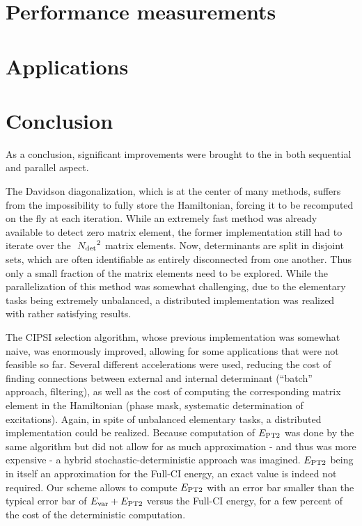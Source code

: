 \documentclass[12pt,a4paper]{report}
\begin{document}
\chapter{Performance measurements}
\minitoc


\chapter{Applications}
\minitoc


\chapter{Conclusion}

As a conclusion, significant improvements were brought to the \QP in both sequential and parallel aspect.

The Davidson diagonalization, which is at the center of many methods, suffers from the impossibility to fully store the Hamiltonian, forcing it to be recomputed on the fly at each iteration. While an extremely fast method was already available to detect zero matrix element,\cite{Scemama_2013} the former implementation still had to iterate over the $~{N_\text{det}}^2$ matrix elements. Now, determinants are split in disjoint sets, which are often identifiable as entirely disconnected from one another. Thus only a small fraction of the matrix elements need to be explored.
While the parallelization of this method was somewhat challenging, due to the elementary tasks being extremely unbalanced, a distributed implementation was realized with rather satisfying results.

The CIPSI selection algorithm, whose previous implementation was somewhat naive, was enormously improved, allowing for some applications that were not feasible so far\cite{Scemama_2018,1806.05115}. Several different accelerations were used, reducing the cost of finding connections between external and internal determinant (``batch'' approach, filtering), as well as the cost of computing the corresponding matrix element in the Hamiltonian (phase mask, systematic determination of excitations). Again, in spite of unbalanced elementary tasks, a distributed implementation could be realized.
Because computation of $E_\text{PT2}$ was done by the same algorithm but did not allow for as much approximation - and thus was more expensive - a hybrid stochastic-deterministic approach was imagined. $E_\text{PT2}$ being in itself an approximation for the Full-CI energy, an exact value is indeed not required. Our scheme allows to compute $E_\text{PT2}$ with an error bar smaller than the typical error bar of $E_{\text{var}} + E_\text{PT2}$ versus the Full-CI energy, for a few percent of the cost of the deterministic computation.
\end{document}
